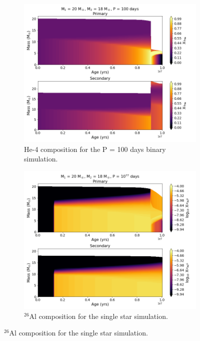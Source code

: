 \begin{figure}
\begin{subfigure}{\columnwidth}
        \includegraphics[width=\textwidth]{figures/results1/fig_He4_Age_M20_P100.png}
        \captionsetup{width=.9\columnwidth}
        \caption{He-4 composition for the P = 100 days binary simulation.}
        \label{subfig:20Msol_He4_Bin}
    \end{subfigure}
    \begin{subfigure}{\columnwidth}
        \includegraphics[width=\textwidth]{figures/results1/fig_Al26_Age_M20_Sin.png}
        \captionsetup{width=.9\columnwidth}
        \caption{$^{26}$Al composition for the single star simulation.}
        \label{subfig:20Msol_Al26_Sin}
    \end{subfigure}

\end{figure}
